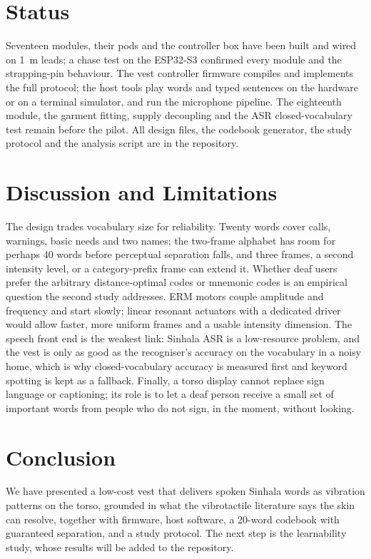 \documentclass[conference]{IEEEtran}
\begin{document}
\section{Status}
Seventeen modules, their pods and the controller box have been built and wired on \SI{1}{m} leads; a chase test on the ESP32-S3 confirmed every module and the strapping-pin behaviour. The vest controller firmware compiles and implements the full protocol; the host tools play words and typed sentences on the hardware or on a terminal simulator, and run the microphone pipeline. The eighteenth module, the garment fitting, supply decoupling and the ASR closed-vocabulary test remain before the pilot. All design files, the codebook generator, the study protocol and the analysis script are in the repository.

\section{Discussion and Limitations}
The design trades vocabulary size for reliability. Twenty words cover calls, warnings, basic needs and two names; the two-frame alphabet has room for perhaps 40 words before perceptual separation falls, and three frames, a second intensity level, or a category-prefix frame can extend it. Whether deaf users prefer the arbitrary distance-optimal codes or mnemonic codes is an empirical question the second study addresses. ERM motors couple amplitude and frequency and start slowly; linear resonant actuators with a dedicated driver would allow faster, more uniform frames and a usable intensity dimension. The speech front end is the weakest link: Sinhala ASR is a low-resource problem, and the vest is only as good as the recogniser's accuracy on the vocabulary in a noisy home, which is why closed-vocabulary accuracy is measured first and keyword spotting is kept as a fallback. Finally, a torso display cannot replace sign language or captioning; its role is to let a deaf person receive a small set of important words from people who do not sign, in the moment, without looking.

\section{Conclusion}
We have presented a low-cost vest that delivers spoken Sinhala words as vibration patterns on the torso, grounded in what the vibrotactile literature says the skin can resolve, together with firmware, host software, a 20-word codebook with guaranteed separation, and a study protocol. The next step is the learnability study, whose results will be added to the repository.



\end{document}
